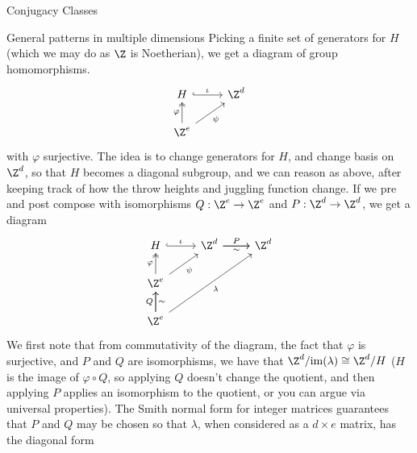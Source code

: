 \documentclass[12nt]{article}
\theoremstyle{plain}
\begin{document}
\begin{subsection}{Conjugacy Classes}
\begin{subsection}{General patterns in multiple dimensions}
Picking a finite set of generators for $H$ (which we may do as $\Z$ is Noetherian), we get a diagram of group homomorphisms. 
\[
\begin{tikzcd}
H  \ar[r, hookrightarrow, "\iota"] & \Z^d \\
\Z^e \ar[u, twoheadrightarrow, "\varphi"] \ar[ur, "\psi"']
\end{tikzcd}
\]
with $\varphi$ surjective. The idea is to change generators for $H$, and change basis on $\Z^d$, so that $H$ becomes a diagonal subgroup, and we can reason as above, after keeping track of how the throw heights and juggling function change. If we pre and post compose with isomorphisms $Q : \Z^e \to \Z^e$ and $P : \Z^d \to \Z^d$, we get a diagram
\[
\begin{tikzcd}
H  \ar[r, hookrightarrow, "\iota"] & \Z^d \ar[r, "P"] \ar[r, "\sim"'] & \Z^d \\
\Z^e \ar[u, twoheadrightarrow, "\varphi"] \ar[ur, "\psi"'] \\
\Z^e \ar[u, "Q"] \ar[u, "\sim"'] \ar[uurr, "\lambda"']
\end{tikzcd}
\]
We first note that from commutativity of the diagram, the fact that $\varphi$ is surjective, and $P$ and $Q$ are isomorphisms, we have that $\Z^d/\text{im}(\lambda) \cong \Z^d/H$ ($H$ is the image of $\varphi \circ Q$, so applying $Q$ doesn't change the quotient, and then applying $P$ applies an isomorphism to the quotient, or you can argue via universal properties). The Smith normal form for integer matrices guarantees that $P$ and $Q$ may be chosen so that $\lambda$, when considered as a $d \times e$ matrix, has the diagonal form 


\end{subsection}
\end{subsection}
\end{document}
